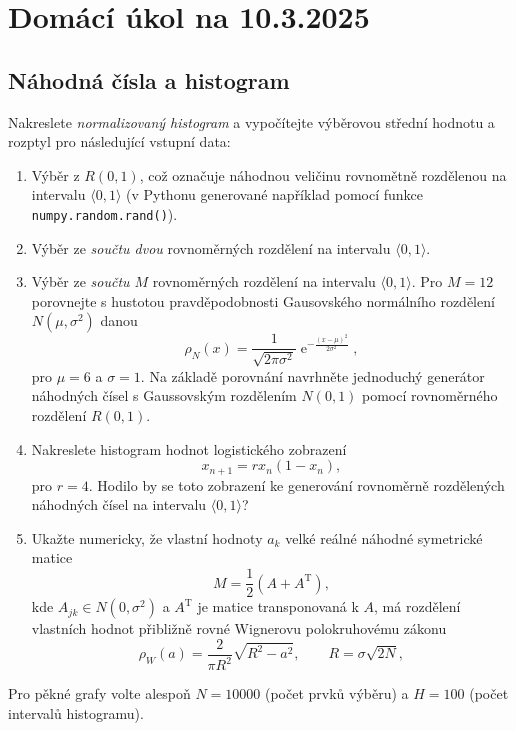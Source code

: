 \documentclass[a4paper,11pt,twoside]{article}
\DeclareMathOperator{\e}{e}
\def\code#1{\textnormal{\texttt{#1}}}
\begin{document}
\section*{Domácí úkol na 10.3.2025}
\subsection*{Náhodná čísla a histogram}
    Nakreslete \emph{normalizovaný histogram} a vypočítejte výběrovou střední hodnotu a rozptyl pro následující vstupní data:
\begin{enumerate}
    \item
        Výběr z $R(0,1)$, což označuje náhodnou veličinu rovnomětně rozdělenou na intervalu $\langle 0,1\rangle$ (v Pythonu generované například pomocí funkce \code{numpy.random.rand()}).

    \item
        Výběr ze \emph{součtu dvou} rovnoměrných rozdělení na intervalu $\langle 0,1\rangle$.

    \item
        Výběr ze \emph{součtu $M$} rovnoměrných rozdělení na intervalu $\langle 0,1\rangle$.
        Pro $M=12$ porovnejte s hustotou pravděpodobnosti Gausovského normálního rozdělení $N(\mu,\sigma^2)$ danou
        \begin{equation}
            \rho_N(x)=\frac{1}{\sqrt{2\pi\sigma^{2}}}\e^{-\frac{(x-\mu)^{2}}{2\sigma^{2}}},
        \end{equation}
        pro $\mu=6$ a $\sigma=1$.
        Na základě porovnání navrhněte jednoduchý generátor náhodných čísel s Gaussovským rozdělením $N(0,1)$ pomocí rovnoměrného rozdělení $R(0,1)$.

    \item
        Nakreslete histogram hodnot logistického zobrazení
        \begin{equation}
            x_{n+1}=rx_{n}(1-x_{n}),
        \end{equation}	
        pro $r=4$.
        Hodilo by se toto zobrazení ke generování rovnoměrně rozdělených náhodných čísel na intervalu $\langle 0,1\rangle$?

    \item
        Ukažte numericky, že vlastní hodnoty $a_{k}$ velké reálné náhodné symetrické matice
        \begin{equation}
            M=\frac{1}{2}\left(A+A^{\mathrm{T}}\right),
        \end{equation}	
        kde $A_{jk}\in N(0,\sigma^{2})$ a $A^{\mathrm{T}}$ je matice transponovaná k $A$, má rozdělení vlastních hodnot přibližně rovné Wignerovu polokruhovému zákonu
        \begin{equation}
            \rho_{W}(a)=\frac{2}{\pi R^{2}}\sqrt{R^{2}-a^{2}},\qquad R=\sigma\sqrt{2N},
        \end{equation}

\end{enumerate}
Pro pěkné grafy volte alespoň $N=10000$ (počet prvků výběru) a $H=100$ (počet intervalů histogramu).
\end{document}
